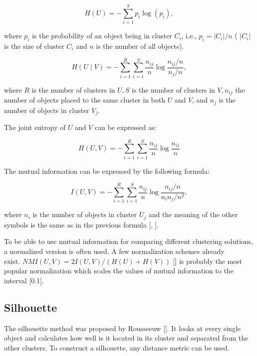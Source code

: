 \begin{equation*}
H(U)=-\sum_{i=1}^{k} p_{i} \log \left(p_{i}\right), \tag{12.51}
\end{equation*}


where $p_{i}$ is the probability of an object being in cluster $C_{i}$, i.e., $p_{i}=\left|C_{i}\right| / n$ ( $\left|C_{i}\right|$ is the size of cluster $C_{i}$ and $n$ is the number of all objects).


\begin{equation*}
H(U \mid V)=-\sum_{i=1}^{R} \sum_{i=1}^{S} \frac{n_{i j}}{n} \log \frac{n_{i j} / n}{n_{j} / n}, \tag{12.52}
\end{equation*}


where $R$ is the number of clusters in $U, S$ is the number of clusters in $V, n_{i j}$ the number of objects placed to the same cluster in both $U$ and $V$, and $n_{j}$ is the number of objects in cluster $V_{j}$.

The joint entropy of $U$ and $V$ can be expressed as:


\begin{equation*}
H(U, V)=-\sum_{i=1}^{R} \sum_{i=1}^{S} \frac{n_{i j}}{n} \log \frac{n_{i j}}{n} \tag{12.53}
\end{equation*}


The mutual information can be expressed by the following formula:


\begin{equation*}
I(U, V)=-\sum_{i=1}^{R} \sum_{i=1}^{S} \frac{n_{i j}}{n} \log \frac{n_{i j} / n}{n_{i} n_{j} / n^{2}}, \tag{12.54}
\end{equation*}


where $n_{i}$ is the number of objects in cluster $U_{j}$ and the meaning of the other symbols is the same as in the previous formula [\cite{ref267}, \cite{ref12}].

To be able to use mutual information for comparing different clustering solutions, a normalized version is often used. A few normalization schemes already\\
exist. $N M I(U, V)=2 I(U, V) /(H(U)+H(V))$ [\cite{ref185}] is probably the most popular normalization which scales the values of mutual information to the interval [0.1].

\subsection{Silhouette}
The silhouette method was proposed by Rousseeuw [\cite{ref231}]. It looks at every single object and calculates how well is it located in its cluster and separated from the other clusters. To construct a silhouette, any distance metric can be used.

